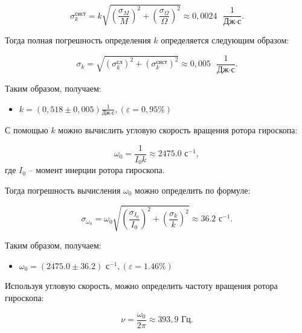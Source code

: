 \documentclass[12pt, a4paper]{article}
\begin{document}
\begin{equation}
\sigma^\text{сист}_k = k\sqrt{\left( \frac{\sigma_M}{M} \right)^2+\left(\frac{\sigma_\Omega}{\Omega} \right)^2} \approx 0,0024 \text{ } \frac{1}{\text{Дж} \cdot \text{с}}.
\end{equation}

Тогда полная погрешность определения $ k $ определяется следующим образом:

\begin{equation}
\sigma_k = \sqrt{\left( \sigma_k^\text{сл} \right)^2 + \left( \sigma_k^\text{сист} \right)^2  } \approx 0,005 \text{ } \frac{1}{\text{Дж} \cdot \text{с}}.
\end{equation}

Таким образом, получаем:

\begin{itemize}
	\item \underline{$ k =\left( 0,518 \pm 0,005 \right) \frac{1}{\text{Дж} \cdot \text{с}} , \left( \varepsilon = 0,95 \% \right) $}
\end{itemize}

С помощью $ k $ можно вычислить угловую скорость вращения ротора гироскопа:

\begin{equation}
\omega_0 = \frac{1}{I_0 k} \approx 2475.0 \text{ с}^{-1},
\end{equation}
где $ I_0 $ -- момент инерции ротора гироскопа.

Тогда погрешность вычисления $ \omega_0 $ можно определить по формуле:

\begin{equation}
\sigma_{\omega_0} = \omega_0 \sqrt{\left( \frac{\sigma_{I_0}}{I_0} \right)^2 + \left( \frac{\sigma_k}{k} \right)^2} \approx 36.2 \text{ с}^{-1}.
\end{equation}

Таким образом, получаем:

\begin{itemize}
	\item \underline{$ \omega_0 =\left( 2475.0 \pm 36.2 \right) \text{ с}^{-1} , \left( \varepsilon = 1.46 \% \right) $}
\end{itemize}

Используя угловую скорость, можно определить частоту вращения ротора гироскопа:

\begin{equation}
\nu = \frac{\omega_0}{2\pi} \approx 393,9 \text{ Гц}.
\end{equation}
\end{document}
